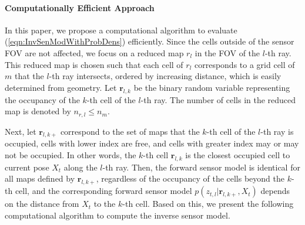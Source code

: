 \documentclass[letterpaper, 10pt, conference]{ieeeconf}
\newcommand{\refeqn}[1]{(\ref{eqn:#1})}
\begin{document}
	
\paragraph{Computationally Efficient Approach}

In this paper, we propose a computational algorithm to evaluate \refeqn{InvSenModWithProbDens} efficiently. 
Since the cells outside of the sensor FOV are not affected, we focus on a reduced map $r_l$ in the FOV of the $l$-th ray. This reduced map is chosen such that each cell of $r_l$ corresponds to a grid cell of $m$ that the $l$-th ray intersects, ordered by increasing distance, which is easily determined from geometry. Let $\mathbf{r}_{l,k}$ be the binary random variable representing the occupancy of the $k$-th cell of the $l$-th ray. The number of cells in the reduced map is denoted by $n_{r,l}\leq n_m$.

Next, let $\mathbf{r}_{l,k+}$ correspond to the set of maps that the $k$-th cell of the $l$-th ray is occupied, cells with lower index are free, and cells with greater index may or may not be occupied. In other words, the $k$-th cell $\mathbf{r}_{l,k}$ is the closest occupied cell to current pose $X_t$ along the $l$-th ray. Then, the forward sensor model is identical for all maps defined by $\mathbf{r}_{l,k+}$, regardless of the occupancy of the cells beyond the $k$-th cell, and the corresponding forward sensor model $p(z_{t,l}|\mathbf{r}_{l,k+},X_{t})$ depends on the distance from $X_t$ to the $k$-th cell. Based on this, we present the following computational algorithm to compute the inverse sensor model.
\end{document}
